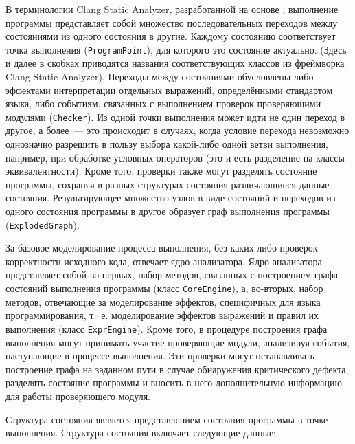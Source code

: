 В терминологии Clang Static Analyzer, разработанной на основе \cite{csa-base}, выполнение программы представляет собой множество последовательных переходов между состояниями из одного состояния в другие. Каждому состоянию соответствует точка выполнения (\texttt{ProgramPoint}), для которого это состояние актуально. (Здесь и далее в скобках приводятся названия соответствующих классов из фреймворка Clang Static Analyzer). Переходы между состояниями обусловлены либо эффектами интерпретации отдельных выражений, определёнными стандартом языка, либо событиям, связанных с выполнением проверок проверяющими модулями (\texttt{Checker}). Из одной точки выполнения может идти не один переход в другое, а более~--- это происходит в случаях, когда условие перехода невозможно однозначно разрешить в пользу выбора какой-либо одной ветви выполнения, например, при обработке условных операторов (это и есть разделение на классы эквивалентности). Кроме того, проверки также могут разделять состояние программы, сохраняя в разных структурах состояния различающиеся данные состояния. Результирующее множество узлов в виде состояний и переходов из одного состояния программы в другое образует граф выполнения программы (\texttt{ExplodedGraph}).

За базовое моделирование процесса выполнения, без каких-либо проверок корректности исходного кода, отвечает ядро анализатора. Ядро анализатора представляет собой во-первых, набор методов, связанных с построением графа состояний выполнения программы (класс \texttt{CoreEngine}), а, во-вторых, набор методов, отвечающие за моделирование эффектов, специфичных для языка программирования, т.~е. моделирование эффектов выражений и правил их выполнения (класс \texttt{ExprEngine}). Кроме того, в процедуре построения графа выполнения могут принимать участие проверяющие модули, анализируя события, наступающие в процессе выполнения. Эти проверки могут останавливать построение графа на заданном пути в случае обнаружения критического дефекта, разделять состояние программы и вносить в него дополнительную информацию для работы проверяющего модуля.

Структура состояния является представлением состояния программы в точке выполнения. Структура состояния включает следующие данные:

